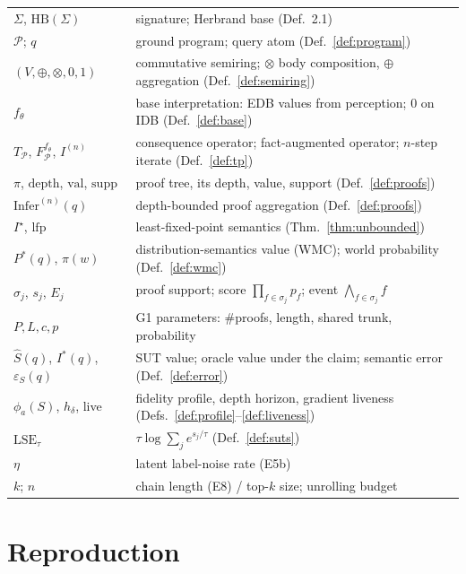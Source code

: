 \documentclass[10pt]{article}
\theoremstyle{remark}
\newcommand{\HB}{\mathrm{HB}}
\newcommand{\Infer}{\mathrm{Infer}}
\newcommand{\val}{\mathrm{val}}
\newcommand{\lfp}{\mathrm{lfp}}
\newcommand{\eps}{\varepsilon}
\newcommand{\sut}{S}
\begin{document}
\begin{center}\small
\begin{tabular}{ll}
\toprule
$\Sigma$, $\HB(\Sigma)$ & signature; Herbrand base (Def.~2.1)\\
$\mathcal P$; $q$ & ground program; query atom (Def.~\ref{def:program})\\
$(V,\oplus,\otimes,0,1)$ & commutative semiring; $\otimes$ body composition, $\oplus$
aggregation (Def.~\ref{def:semiring})\\
$f_\theta$ & base interpretation: EDB values from perception; $0$ on IDB
(Def.~\ref{def:base})\\
$T_{\mathcal P}$, $F^{f_\theta}_{\mathcal P}$, $I^{(n)}$ & consequence operator; fact-augmented
operator; $n$-step iterate (Def.~\ref{def:tp})\\
$\pi$, $\mathrm{depth}$, $\val$, $\mathrm{supp}$ & proof tree, its depth, value, support
(Def.~\ref{def:proofs})\\
$\Infer^{(n)}(q)$ & depth-bounded proof aggregation (Def.~\ref{def:proofs})\\
$I^\star$, $\lfp$ & least-fixed-point semantics (Thm.~\ref{thm:unbounded})\\
$P^*(q)$, $\pi(w)$ & distribution-semantics value (WMC); world probability
(Def.~\ref{def:wmc})\\
$\sigma_j$, $s_j$, $E_j$ & proof support; score $\prod_{f\in\sigma_j}p_f$; event
$\bigwedge_{f \in \sigma_j} f$\\
$P, L, c, p$ & G1 parameters: \#proofs, length, shared trunk, probability\\
$\hat\sut(q)$, $I^*(q)$, $\eps_\sut(q)$ & SUT value; oracle value under the claim; semantic
error (Def.~\ref{def:error})\\
$\phi_a(\sut)$, $h_\delta$, live & fidelity profile, depth horizon, gradient liveness
(Defs.~\ref{def:profile}--\ref{def:liveness})\\
$\mathrm{LSE}_\tau$ & $\tau\log\sum_j e^{s_j/\tau}$ (Def.~\ref{def:suts})\\
$\eta$ & latent label-noise rate (E5b)\\
$k$; $n$ & chain length (E8) / top-$k$ size; unrolling budget\\
\bottomrule
\end{tabular}
\end{center}

\section{Reproduction}\label{app:repro}
\end{document}
